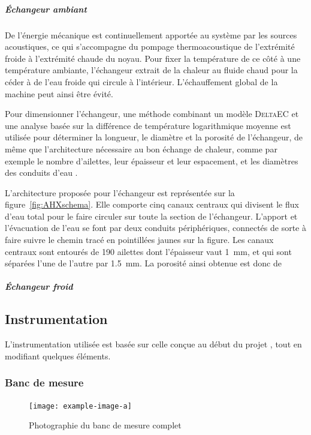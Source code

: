 \subparagraph{\'Echangeur ambiant} 
De l'énergie mécanique est continuellement apportée au système par les sources acoustiques, ce qui s'accompagne du pompage thermoacoustique de l'extrémité froide à l'extrémité chaude du noyau. Pour fixer la température de ce côté à une température ambiante, l'échangeur extrait de la chaleur au fluide chaud pour la céder à de l'eau froide qui circule à l'intérieur. L'échauffement global de la machine peut ainsi être évité.

Pour dimensionner l'échangeur, une méthode combinant un modèle \textsc{DeltaEC} et une analyse basée sur la différence de température logarithmique moyenne est utilisée pour déterminer la longueur, le diamètre et la porosité de l'échangeur, de même que l'architecture nécessaire au bon échange de chaleur, comme par exemple le nombre d'ailettes, leur épaisseur et leur espacement, et les diamètres des conduits d'eau \cite{ramadan_design_2021}.

L'architecture proposée pour l'échangeur est représentée sur la figure~\ref{fig:AHXschema}. Elle comporte cinq canaux centraux qui divisent le flux d'eau total pour le faire circuler sur toute la section de l'échangeur. L'apport et l'évacuation de l'eau se font par deux conduits périphériques, connectés de sorte à faire suivre le chemin tracé en pointillées jaunes sur la figure. Les canaux centraux sont entourés de \num{190} ailettes dont l'épaisseur vaut \qty{1}{\milli\meter}, et qui sont séparées l'une de l'autre par \qty{1.5}{\milli\metre}. La porosité ainsi obtenue est donc de 


\subparagraph{\'Echangeur froid}

\subsection{Instrumentation}
L'instrumentation utilisée est basée sur celle conçue au début du projet \cite{ramadan_design_2021}, tout en modifiant quelques éléments.


\subsubsection{Banc de mesure}
\begin{figure}[!ht]
	\centering
%	
\texttt{[image: example-image-a]}
	\caption{Photographie du banc de mesure complet}
	\label{fig:BancMesureComplet}
\end{figure}
